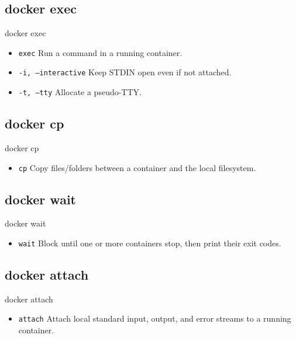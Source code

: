 \subsection{docker exec}\label{subsec:docker-exec}
\begin{frame}{docker exec}
    \begin{itemize}
        \item \texttt{exec} Run a command in a running container.
        \item \texttt{-i, --interactive} Keep STDIN open even if not attached.
        \item \texttt{-t, --tty} Allocate a pseudo-TTY.
        
    \end{itemize}
\end{frame}

\subsection{docker cp}\label{subsec:docker-cp}
\begin{frame}{docker cp}
    \begin{itemize}
        \item \texttt{cp} Copy files/folders between a container and the local filesystem.
        
    \end{itemize}
\end{frame}

\subsection{docker wait}\label{subsec:docker-wait}
\begin{frame}{docker wait}
    \begin{itemize}
        \item \texttt{wait} Block until one or more containers stop, then print their exit codes.
        
    \end{itemize}
\end{frame}

\subsection{docker attach}\label{subsec:docker-attach}
\begin{frame}{docker attach}
    \begin{itemize}
        \item \texttt{attach} Attach local standard input, output, and error streams to a running container.
        
    \end{itemize}
\end{frame}
